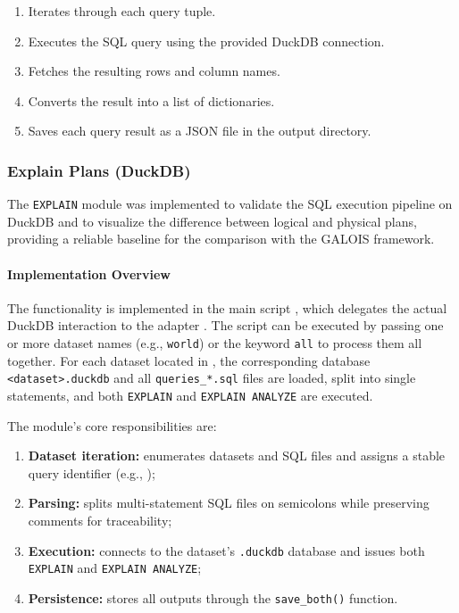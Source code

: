 \documentclass[12pt,a4paper]{article}
\begin{document}
\begin{enumerate}
    \item Iterates through each query tuple.
    \item Executes the SQL query using the provided DuckDB connection.
    \item Fetches the resulting rows and column names.
    \item Converts the result into a list of dictionaries.
    \item Saves each query result as a JSON file in the output directory.
\end{enumerate}

\subsubsection{Explain Plans (DuckDB)}
\label{sec:explain-plans}

The \texttt{EXPLAIN} module was implemented to validate the SQL execution
pipeline on DuckDB and to visualize the difference between logical and
physical plans, providing a reliable baseline for the comparison with the
GALOIS framework. 

\paragraph{Implementation Overview}
The functionality is implemented in the main script
, which delegates the
actual DuckDB interaction to the adapter
. The script can be executed by passing
one or more dataset names (e.g., \texttt{world}) or the keyword
\texttt{all} to process them all together. For each dataset located in
, the corresponding database
\texttt{<dataset>.duckdb} and all \texttt{queries\_*.sql} files are loaded,
split into single statements, and both \texttt{EXPLAIN} and
\texttt{EXPLAIN ANALYZE} are executed.

The module’s core responsibilities are:
\begin{enumerate}
  \item \textbf{Dataset iteration:} enumerates datasets and SQL files and assigns a stable query identifier
        (e.g., );
  \item \textbf{Parsing:} splits multi-statement SQL files on semicolons while preserving comments for traceability;
  \item \textbf{Execution:} connects to the dataset’s \texttt{.duckdb} database and issues both \texttt{EXPLAIN} and
        \texttt{EXPLAIN ANALYZE};
  \item \textbf{Persistence:} stores all outputs through the \texttt{save\_both()} function.
\end{enumerate}
\end{document}
